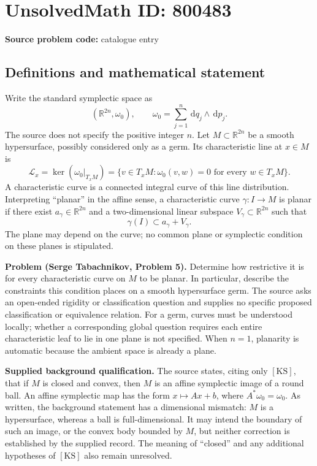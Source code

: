 \documentclass[11pt]{article}
\newcommand{\R}{\mathbb{R}}
\newcommand{\dd}{\,\mathrm{d}}
\begin{document}
\section*{UnsolvedMath ID: 800483}
\textbf{Source problem code:} catalogue entry
\subsection{Definitions and mathematical statement}
Write the standard symplectic space as
\[
(\R^{2n},\omega_0),\qquad \omega_0=\sum_{j=1}^{n}\dd q_j\wedge\dd p_j.
\]
The source does not specify the positive integer \(n\). Let \(M\subset\R^{2n}\) be a smooth hypersurface, possibly considered only as a germ. Its characteristic line at \(x\in M\) is
\[
\mathcal L_x=\ker(\omega_0|_{T_xM})
=\{v\in T_xM:\omega_0(v,w)=0\text{ for every }w\in T_xM\}.
\]
A characteristic curve is a connected integral curve of this line distribution. Interpreting ``planar'' in the affine sense, a characteristic curve \(\gamma:I\to M\) is planar if there exist \(a_\gamma\in\R^{2n}\) and a two-dimensional linear subspace \(V_\gamma\subset\R^{2n}\) such that
\[
\gamma(I)\subset a_\gamma+V_\gamma.
\]
The plane may depend on the curve; no common plane or symplectic condition on these planes is stipulated.

\textbf{Problem (Serge Tabachnikov, Problem 5).} Determine how restrictive it is for every characteristic curve on \(M\) to be planar. In particular, describe the constraints this condition places on a smooth hypersurface germ. The source asks an open-ended rigidity or classification question and supplies no specific proposed classification or equivalence relation. For a germ, curves must be understood locally; whether a corresponding global question requires each entire characteristic leaf to lie in one plane is not specified. When \(n=1\), planarity is automatic because the ambient space is already a plane.

\textbf{Supplied background qualification.} The source states, citing only \([\mathrm{KS}]\), that if \(M\) is closed and convex, then \(M\) is an affine symplectic image of a round ball. An affine symplectic map has the form \(x\mapsto Ax+b\), where \(A^*\omega_0=\omega_0\). As written, the background statement has a dimensional mismatch: \(M\) is a hypersurface, whereas a ball is full-dimensional. It may intend the boundary of such an image, or the convex body bounded by \(M\), but neither correction is established by the supplied record. The meaning of ``closed'' and any additional hypotheses of \([\mathrm{KS}]\) also remain unresolved.
\end{document}
